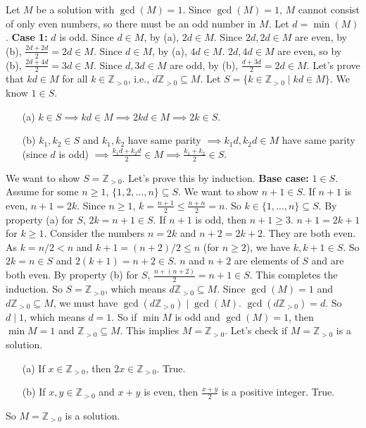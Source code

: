\documentclass[12pt,a4paper]{article}
\theoremstyle{definition}
\begin{document}
    Let $M$ be a solution with $\gcd(M)=1$.
    Since $\gcd(M)=1$, $M$ cannot consist of only even numbers, so there must be an odd number in $M$.
    Let $d = \min(M)$.
    \textbf{Case 1:} $d$ is odd.
    Since $d \in M$, by (a), $2d \in M$.
    Since $2d, 2d \in M$ are even, by (b), $\frac{2d+2d}{2}=2d \in M$.
    Since $d \in M$, by (a), $4d \in M$.
    $2d, 4d \in M$ are even, so by (b), $\frac{2d+4d}{2} = 3d \in M$.
    Since $d, 3d \in M$ are odd, by (b), $\frac{d+3d}{2}=2d \in M$.
    Let's prove that $kd \in M$ for all $k \in \mathbb{Z}_{>0}$, i.e., $d\mathbb{Z}_{>0} \subseteq M$.
    Let $S = \{k \in \mathbb{Z}_{>0} \mid kd \in M\}$. We know $1 \in S$.
    \begin{enumerate}
        \item[(a)] $k \in S \implies kd \in M \implies 2kd \in M \implies 2k \in S$.
        \item[(b)] $k_1, k_2 \in S$ and $k_1, k_2$ have same parity $\implies k_1d, k_2d \in M$ have same parity (since $d$ is odd) $\implies \frac{k_1d+k_2d}{2} \in M \implies \frac{k_1+k_2}{2} \in S$.
    \end{enumerate}
    We want to show $S = \mathbb{Z}_{>0}$. Let's prove this by induction.
    \textbf{Base case:} $1 \in S$.
    Assume for some $n \geq 1$, $\{1, 2, \ldots, n\} \subseteq S$. We want to show $n+1 \in S$.
    If $n+1$ is even, $n+1=2k$. Since $n \geq 1$, $k = \frac{n+1}{2} \leq \frac{n+n}{2} = n$. So $k \in \{1, \ldots, n\} \subseteq S$. By property (a) for $S$, $2k=n+1 \in S$.
    If $n+1$ is odd, then $n+1 \geq 3$. $n+1 = 2k+1$ for $k \geq 1$.
    Consider the numbers $n=2k$ and $n+2=2k+2$. They are both even.
    As $k = n/2 < n$ and $k+1 = (n+2)/2 \leq n$ (for $n \geq 2$), we have $k, k+1 \in S$.
    So $2k=n \in S$ and $2(k+1)=n+2 \in S$.
    $n$ and $n+2$ are elements of $S$ and are both even.
    By property (b) for $S$, $\frac{n+(n+2)}{2} = n+1 \in S$. This completes the induction.
    So $S=\mathbb{Z}_{>0}$, which means $d\mathbb{Z}_{>0} \subseteq M$.
    Since $\gcd(M)=1$ and $d\mathbb{Z}_{>0} \subseteq M$, we must have $\gcd(d\mathbb{Z}_{>0}) \mid \gcd(M)$.
    $\gcd(d\mathbb{Z}_{>0}) = d$. So $d \mid 1$, which means $d=1$.
    So if $\min M$ is odd and $\gcd(M)=1$, then $\min M = 1$ and $\mathbb{Z}_{>0} \subseteq M$.
    This implies $M=\mathbb{Z}_{>0}$.
    Let's check if $M=\mathbb{Z}_{>0}$ is a solution.
    \begin{enumerate}
        \item[(a)] If $x \in \mathbb{Z}_{>0}$, then $2x \in \mathbb{Z}_{>0}$. True.
        \item[(b)] If $x,y \in \mathbb{Z}_{>0}$ and $x+y$ is even, then $\frac{x+y}{2}$ is a positive integer. True.
    \end{enumerate}
    So $M=\mathbb{Z}_{>0}$ is a solution.
\end{document}

